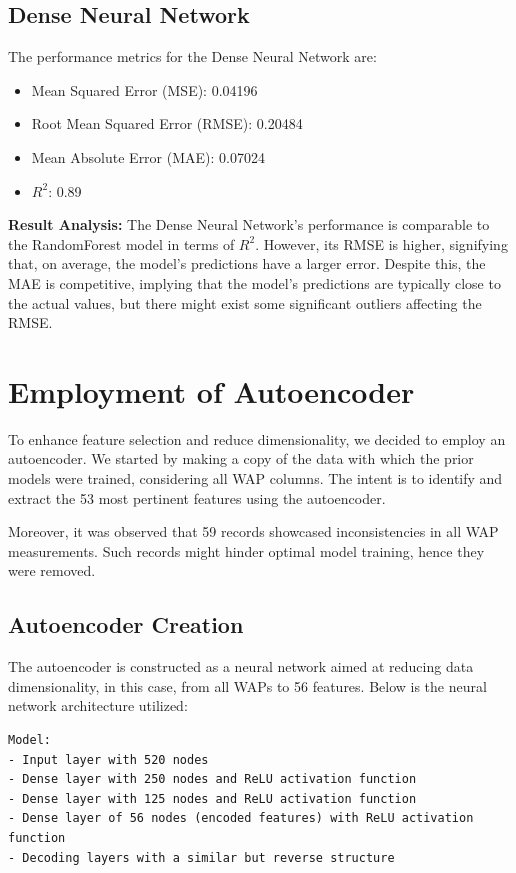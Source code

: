 \documentclass[conference]{IEEEtran}
\begin{document}
\subsection{Dense Neural Network}

The performance metrics for the Dense Neural Network are:

\begin{itemize}
    \item Mean Squared Error (MSE): 0.04196
    \item Root Mean Squared Error (RMSE): 0.20484
    \item Mean Absolute Error (MAE): 0.07024
    \item \( R^2 \): 0.89
\end{itemize}

\textbf{Result Analysis:}
The Dense Neural Network's performance is comparable to the RandomForest model in terms of \( R^2 \). However, its RMSE is higher, signifying that, on average, the model's predictions have a larger error. Despite this, the MAE is competitive, implying that the model's predictions are typically close to the actual values, but there might exist some significant outliers affecting the RMSE.

\section{Employment of Autoencoder}

To enhance feature selection and reduce dimensionality, we decided to employ an autoencoder. We started by making a copy of the data with which the prior models were trained, considering all WAP columns. The intent is to identify and extract the 53 most pertinent features using the autoencoder.

Moreover, it was observed that 59 records showcased inconsistencies in all WAP measurements. Such records might hinder optimal model training, hence they were removed.

\subsection{Autoencoder Creation}

The autoencoder is constructed as a neural network aimed at reducing data dimensionality, in this case, from all WAPs to 56 features. Below is the neural network architecture utilized:

\begin{lstlisting}
Model:
- Input layer with 520 nodes
- Dense layer with 250 nodes and ReLU activation function
- Dense layer with 125 nodes and ReLU activation function
- Dense layer of 56 nodes (encoded features) with ReLU activation function
- Decoding layers with a similar but reverse structure
\end{lstlisting}
\end{document}
